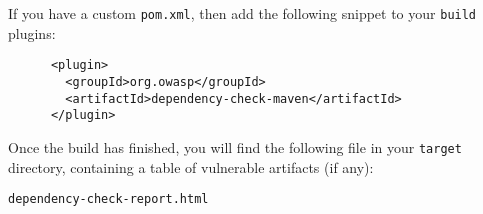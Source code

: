 \noindent If you have a custom \texttt{pom.xml}, then add the following snippet to your \texttt{build} plugins:

\begin{verbatim}
      <plugin>
        <groupId>org.owasp</groupId>
        <artifactId>dependency-check-maven</artifactId>
      </plugin>
\end{verbatim}

\noindent Once the build has finished, you will find the following file in your \texttt{target} directory,
containing a table of vulnerable artifacts (if any):

\begin{verbatim}
dependency-check-report.html
\end{verbatim}
